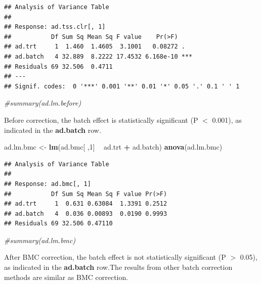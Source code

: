 \documentclass[]{book}
\newenvironment{Shaded}{\begin{snugshade}}{\end{snugshade}}
\newcommand{\KeywordTok}[1]{\textcolor[rgb]{0.13,0.29,0.53}{\textbf{#1}}}
\newcommand{\DecValTok}[1]{\textcolor[rgb]{0.00,0.00,0.81}{#1}}
\newcommand{\StringTok}[1]{\textcolor[rgb]{0.31,0.60,0.02}{#1}}
\newcommand{\CommentTok}[1]{\textcolor[rgb]{0.56,0.35,0.01}{\textit{#1}}}
\newcommand{\OperatorTok}[1]{\textcolor[rgb]{0.81,0.36,0.00}{\textbf{#1}}}
\newcommand{\NormalTok}[1]{#1}
\begin{document}
\begin{verbatim}
## Analysis of Variance Table
## 
## Response: ad.tss.clr[, 1]
##           Df Sum Sq Mean Sq F value    Pr(>F)    
## ad.trt     1  1.460  1.4605  3.1001   0.08272 .  
## ad.batch   4 32.889  8.2222 17.4532 6.168e-10 ***
## Residuals 69 32.506  0.4711                      
## ---
## Signif. codes:  0 '***' 0.001 '**' 0.01 '*' 0.05 '.' 0.1 ' ' 1
\end{verbatim}

\begin{Shaded}
\begin{Highlighting}[]
\CommentTok{#summary(ad.lm.before)}
\end{Highlighting}
\end{Shaded}

Before correction, the batch effect is statistically significant (P
\(<\) 0.001), as indicated in the \textbf{ad.batch} row.

\begin{Shaded}
\begin{Highlighting}[]
\NormalTok{ad.lm.bmc <-}\StringTok{ }\KeywordTok{lm}\NormalTok{(ad.bmc[ ,}\DecValTok{1}\NormalTok{] }\OperatorTok{~}\StringTok{ }\NormalTok{ad.trt }\OperatorTok{+}\StringTok{ }\NormalTok{ad.batch)}
\KeywordTok{anova}\NormalTok{(ad.lm.bmc)}
\end{Highlighting}
\end{Shaded}

\begin{verbatim}
## Analysis of Variance Table
## 
## Response: ad.bmc[, 1]
##           Df Sum Sq Mean Sq F value Pr(>F)
## ad.trt     1  0.631 0.63084  1.3391 0.2512
## ad.batch   4  0.036 0.00893  0.0190 0.9993
## Residuals 69 32.506 0.47110
\end{verbatim}

\begin{Shaded}
\begin{Highlighting}[]
\CommentTok{#summary(ad.lm.bmc)}
\end{Highlighting}
\end{Shaded}

After BMC correction, the batch effect is not statistically significant
(P \(>\) 0.05), as indicated in the \textbf{ad.batch} row.The results
from other batch correction methods are similar as BMC correction.
\end{document}
